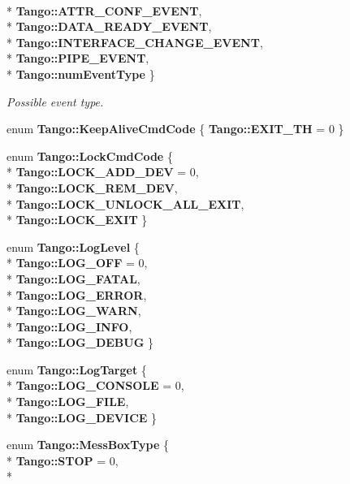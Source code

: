 \begin{DoxyCompactItemize}
\\*
{\bf Tango\-::\-A\-T\-T\-R\-\_\-\-C\-O\-N\-F\-\_\-\-E\-V\-E\-N\-T}, 
\\*
{\bf Tango\-::\-D\-A\-T\-A\-\_\-\-R\-E\-A\-D\-Y\-\_\-\-E\-V\-E\-N\-T}, 
\\*
{\bf Tango\-::\-I\-N\-T\-E\-R\-F\-A\-C\-E\-\_\-\-C\-H\-A\-N\-G\-E\-\_\-\-E\-V\-E\-N\-T}, 
\\*
{\bf Tango\-::\-P\-I\-P\-E\-\_\-\-E\-V\-E\-N\-T}, 
\\*
{\bf Tango\-::num\-Event\-Type}
 \}
\begin{DoxyCompactList}\small\item\em Possible event type. \end{DoxyCompactList}\item 
enum {\bf Tango\-::\-Keep\-Alive\-Cmd\-Code} \{ {\bf Tango\-::\-E\-X\-I\-T\-\_\-\-T\-H} = 0
 \}
\item 
enum {\bf Tango\-::\-Lock\-Cmd\-Code} \{ \\*
{\bf Tango\-::\-L\-O\-C\-K\-\_\-\-A\-D\-D\-\_\-\-D\-E\-V} = 0, 
\\*
{\bf Tango\-::\-L\-O\-C\-K\-\_\-\-R\-E\-M\-\_\-\-D\-E\-V}, 
\\*
{\bf Tango\-::\-L\-O\-C\-K\-\_\-\-U\-N\-L\-O\-C\-K\-\_\-\-A\-L\-L\-\_\-\-E\-X\-I\-T}, 
\\*
{\bf Tango\-::\-L\-O\-C\-K\-\_\-\-E\-X\-I\-T}
 \}
\item 
enum {\bf Tango\-::\-Log\-Level} \{ \\*
{\bf Tango\-::\-L\-O\-G\-\_\-\-O\-F\-F} = 0, 
\\*
{\bf Tango\-::\-L\-O\-G\-\_\-\-F\-A\-T\-A\-L}, 
\\*
{\bf Tango\-::\-L\-O\-G\-\_\-\-E\-R\-R\-O\-R}, 
\\*
{\bf Tango\-::\-L\-O\-G\-\_\-\-W\-A\-R\-N}, 
\\*
{\bf Tango\-::\-L\-O\-G\-\_\-\-I\-N\-F\-O}, 
\\*
{\bf Tango\-::\-L\-O\-G\-\_\-\-D\-E\-B\-U\-G}
 \}
\item 
enum {\bf Tango\-::\-Log\-Target} \{ \\*
{\bf Tango\-::\-L\-O\-G\-\_\-\-C\-O\-N\-S\-O\-L\-E} = 0, 
\\*
{\bf Tango\-::\-L\-O\-G\-\_\-\-F\-I\-L\-E}, 
\\*
{\bf Tango\-::\-L\-O\-G\-\_\-\-D\-E\-V\-I\-C\-E}
 \}
\item 
enum {\bf Tango\-::\-Mess\-Box\-Type} \{ \\*
{\bf Tango\-::\-S\-T\-O\-P} = 0, 
\\*

\end{DoxyCompactItemize}
